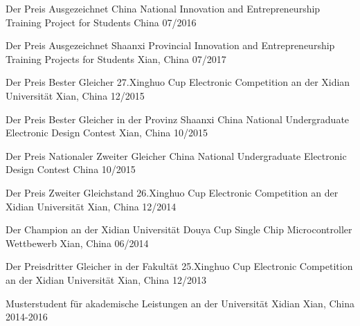 \begin{cvhonors}

  \cvhonor
    {Der Preis Ausgezeichnet} %
    {China National Innovation and Entrepreneurship Training Project for Students} %
    {China} %
    {07/2016} %

  \cvhonor
    {Der Preis Ausgezeichnet} %
    {Shaanxi Provincial Innovation and Entrepreneurship Training Projects for Students} %
    {Xian, China} %
    {07/2017} %

  \cvhonor
    {Der Preis Bester Gleicher} %
    {27.Xinghuo Cup Electronic Competition an der Xidian Universität} %
    {Xian, China} %
    {12/2015} %

  \cvhonor
	{Der Preis Bester Gleicher in der Provinz Shaanxi} %
	{China National Undergraduate Electronic Design Contest} %
	{Xian, China} %
	{10/2015} %

  \cvhonor
	{Der Preis Nationaler Zweiter Gleicher} %
	{China National Undergraduate Electronic Design Contest} %
	{China} %
	{10/2015} %

  \cvhonor
	{Der Preis Zweiter Gleichstand } %
	{26.Xinghuo Cup Electronic Competition an der Xidian Universität} %
	{Xian, China} %
	{12/2014} %

  \cvhonor
	{Der Champion an der Xidian Universität} %
	{Douya Cup Single Chip Microcontroller Wettbewerb} %
	{Xian, China} %
	{06/2014} %

  \cvhonor
	{Der Preisdritter Gleicher in der Fakultät} %
	{25.Xinghuo Cup Electronic Competition an der Xidian Universität} %
	{Xian, China} %
	{12/2013} %

  \cvhonor
	{Musterstudent für akademische Leistungen an der Universität Xidian } %
	{} %
	{Xian, China} %
	{2014-2016} %


\end{cvhonors}

